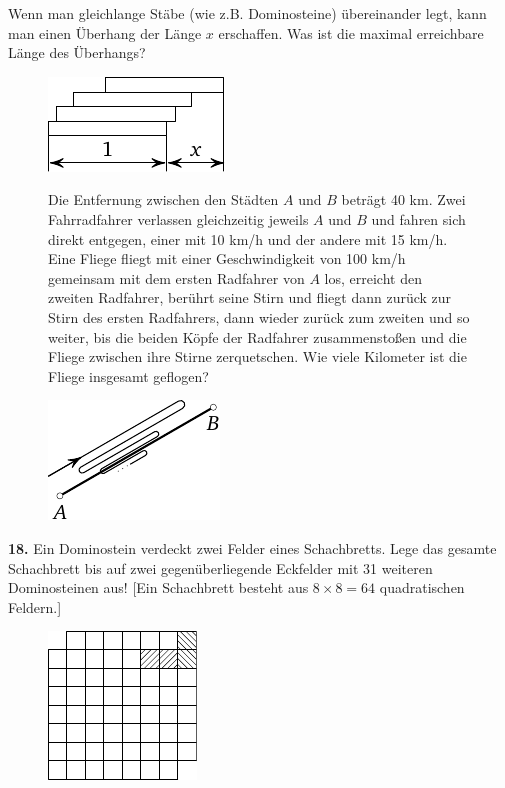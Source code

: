 \documentclass[12pt]{article} %
\begin{document}
 Wenn man gleichlange Stäbe (wie z.B. Dominosteine) übereinander legt, kann man einen Überhang der Länge $x$ erschaffen. Was ist die maximal erreichbare Länge des Überhangs? 
\begin{figure}[h!]
\centering
\footnotesize
\includegraphics[scale=1]{taskbook-97}
\end{figure}
\begin{figure}[h]
\begin{minipage}[c][][c]{0.7 \textwidth}
 Die Entfernung zwischen den Städten $A$ und $B$ beträgt 40 km. Zwei Fahrradfahrer verlassen gleich\-zei\-tig jeweils $A$ und $B$ und fahren sich direkt entgegen, einer mit 10 km/h und der andere mit 15 km/h. Eine Fliege fliegt mit einer Geschwindigkeit von 100 km/h gemeinsam mit dem ersten Radfahrer von $A$ los, erreicht den zweiten Radfahrer, berührt seine Stirn und fliegt dann zurück zur Stirn des ersten Radfahrers, dann wieder zurück zum zweiten und so weiter, bis die beiden Köpfe der Radfahrer zusammenstoßen und die Fliege zwischen ihre Stirne zerquetschen. 
Wie viele Kilometer ist die Fliege insgesamt geflogen? 
\end{minipage}
\hfill
\begin{minipage}[c]{0.2 \textwidth}
\includegraphics[scale=1]{taskbook-1}
\end{minipage}
\end{figure}

\medskip\noindent
{\bf 18.} Ein Dominostein verdeckt zwei Felder eines Schachbretts. Lege das gesamte Schachbrett bis auf zwei gegenüberliegende Eckfelder mit 31 weiteren Dominosteinen aus! [Ein Schachbrett besteht aus $8 \times 8 = 64$ quadratischen Feldern.]
\begin{figure}[h]
\centering
\footnotesize
\includegraphics[scale=1]{taskbook-2}
\end{figure}
\end{document}
